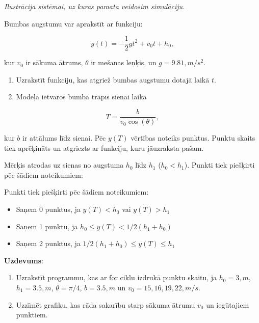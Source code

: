 \emph{Ilustrācija sistēmai, uz kuras pamata veidosim simulāciju.}

Bumbas augstumu var aprakstīt ar funkciju:

\[
y(t) = -\frac{1}{2} g t^2 + v_0 t + h_0,
\]

kur \(v_0\) ir sākuma ātrums, \(\theta\) ir mešanas leņķis, un
\(g = 9.81 , m/s^2\).

\begin{enumerate}
\def\labelenumi{\alph{enumi})}
\item
  Uzrakstīt funkciju, kas atgriež bumbas augstumu dotajā laikā \(t\).
\item
  Modeļa ietvaros bumba trāpīs sienai laikā
\end{enumerate}

\[
T = \frac{b}{v_0 \cos(\theta)},
\]

kur \(b\) ir attālums līdz sienai. Pēc \(y(T)\) vērtības noteiks
punktus. Punktu skaits tiek aprēķināts un atgriezts ar funkciju, kuru
jāuzraksta pašam.

Mērķis atrodas uz sienas no augstuma \(h_0\) līdz \(h_1\)
(\(h_0 < h_1\)). Punkti tiek piešķirti pēc šādiem noteikumiem:

Punkti tiek piešķirti pēc šādiem noteikumiem:

\begin{itemize}
\tightlist
\item
  Saņem 0 punktus, ja \(y(T) < h_0\) vai \(y(T) > h_1\)
\item
  Saņem 1 punktu, ja \(h_0 ≤ y(T) < 1/2 (h_1 + h_0)\)
\item
  Saņem 2 punktus, ja \(1/2 (h_1 + h_0) ≤ y(T) ≤ h_1\)
\end{itemize}

\textbf{Uzdevums}:

\begin{enumerate}
\def\labelenumi{\alph{enumi})}
\item
  Uzrakstīt programmu, kas ar for ciklu izdrukā punktu skaitu, ja
  \(h_0 = 3 , m\), \(h_1 = 3.5 , m\), \(\theta = \pi/4\),
  \(b = 3.5 , m\) un \(v_0 = 15, 16, 19, 22 , m/s\).
\item
  Uzzīmēt grafiku, kas rāda sakarību starp sākuma ātrumu \(v_0\) un
  iegūtajiem punktiem.
\end{enumerate}
